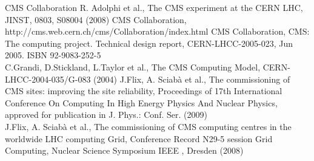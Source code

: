 

\begin{thebibliography}{}
%
%
CMS Collaboration R. Adolphi et al., The CMS experiment at the CERN LHC, JINST, 0803, S08004 (2008)
%
CMS Collaboration, http://cms.web.cern.ch/cms/Collaboration/index.html
%
CMS Collaboration, CMS: The computing project. Technical design report, CERN-LHCC-2005-023, Jun 2005. ISBN 92-9083-252-5 \\
C.Grandi, D.Stickland, L.Taylor et al., The CMS Computing Model, CERN-LHCC-2004-035/G-083 (2004)
%
J.Flix, A. Sciab\`a et al., The commissioning of CMS sites: improving the site reliability,  Proceedings of 17th International Conference On Computing In High Energy Physics And Nuclear Physics,  approved for publication in J. Phys.: Conf. Ser. (2009) \\
J.Flix, A. Sciab\`a et al., The commissioning of CMS computing centres in the worldwide LHC computing Grid, Conference Record N29-5 session Grid Computing, Nuclear Science Symposium IEEE , Dresden (2008)


\end{thebibliography}
